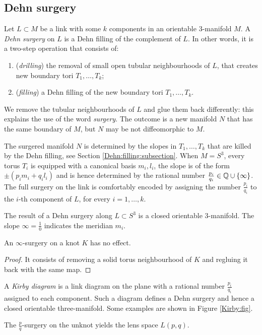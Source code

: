 \subsection{Dehn surgery}
Let $L\subset M$ be a link with some $k$ components in an orientable 3-manifold $M$. A \emph{Dehn surgery} on $L$ is a Dehn filling of the complement of $L$. In other words, it is a two-step operation that consists of:
\begin{enumerate}
\item (\emph{drilling}) the removal of small open tubular neighbourhoods of $L$, that creates new boundary tori $T_1,\ldots, T_k$; 
\item (\emph{filling}) a Dehn filling of the new boundary tori $T_1,\ldots, T_k$.
\end{enumerate}
We remove the tubular neighbourhoods of $L$ and glue them back differently: this explains the use of the word \emph{surgery}.
The outcome is a new manifold $N$ that has the same boundary of $M$, but $N$ may be not diffeomorphic to $M$.

The surgered manifold $N$ is determined by the slopes in $T_1, \ldots, T_k$ that are killed by the Dehn filling, see Section \ref{Dehn:filling:subsection}. When $M=S^3$, every torus $T_i $ is equipped with a canonical basis $m_i, l_i$, the slope is of the form $\pm(p_im_i + q_il_i)$ and is hence determined by the rational number $\frac {p_i}{q_i}\in\mathbb{Q} \cup \{\infty\}$. The full surgery on the link is comfortably encoded by assigning the number $\frac {p_i}{q_i}$ to the $i$-th component of $L$, for every $i=1,\ldots,k$.

The result of a Dehn surgery along $L\subset S^3$ is a closed orientable 3-manifold. The slope $\infty = \frac 10$ indicates the meridian $m_i$.

\begin{prop} An $\infty$-surgery on a knot $K$ has no effect.
\end{prop}
\begin{proof}
It consists of removing a solid torus neighbourhood of $K$ and regluing it back with the same map.
\end{proof}

A \emph{Kirby diagram} is a link diagram on the plane with a rational number $\frac{p_i}{q_i}$ assigned to each component. Such a diagram defines a Dehn surgery and hence a closed orientable three-manifold. Some examples are shown in Figure \ref{Kirby:fig}.

\begin{ex} 
The $\frac pq$-surgery on the unknot yields the lens space $L(p,q)$.
\end{ex}


